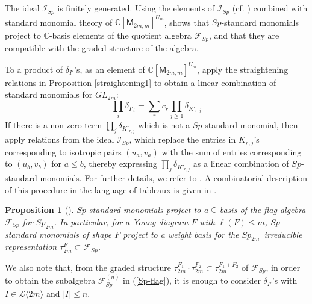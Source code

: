 \documentclass[11pt]{amsart}
\numberwithin{equation}{subsection}
\newtheorem{proposition}[theorem]{Proposition}
\begin{document}
\medskip

\subsection{}\label{straightening2}
The ideal $\mathcal{I}_{{Sp}}$ is finitely generated. 
Using the elements of  $\mathcal{I}_{{Sp}}$ (cf. \cite[\S 17.3]{FH91}) combined 
with standard monomial theory 
of $\mathbb{C}[\mathsf{M}_{2m,m}]^{U_m}$,  \cite{Ki08} shows that 
$Sp$-standard monomials project to $\mathbb{C}$-basis elements of the quotient algebra
$\mathcal{F}_{Sp}$, and that they are compatible with the graded structure of the algebra.

\smallskip

To a product of ${\delta}_{I'}$'s, as an element of $\mathbb{C}[\mathsf{M}_{2m,m}]^{U_m}$, apply 
the straightening relations in Proposition \ref{straightening1} to obtain a linear combination of 
standard monomials for $GL_{2m}$:
$$\prod_i {\delta} _{{I'}_i}=\sum_{r} c_{r} \prod_{j \geq 1} {\delta} _{K'_{r,j}}$$
If there is a non-zero term $\prod_j {\delta} _{K'_{r,j}}$ which is not a $Sp$-standard monomial,
then apply relations from the ideal $\mathcal{I}_{{Sp}}$, which replace the entries in $K_{r,j}$'s
corresponding to isotropic pairs $(u_a, v_{a})$ with the sum of entries corresponding to 
$(u_b, v_{b})$ for $a \leq b$, thereby expressing $\prod_{j} {\delta} _{K'_{r,j}}$ 
as a linear combination of $Sp$-standard monomials. For further details, we refer to \cite{Ki08}.  
A combinatorial description of this procedure in the language of tableaux is given in \cite{Be86}.

\begin{proposition}[{\protect\cite[Theorem 5.20]{Ki08}}]\label{Sp_flagSMT}
${Sp}$-standard monomials project to a $\mathbb{C}$-basis
of the flag algebra $\mathcal{F}_{{Sp}}$ for ${Sp}_{2m}$. In particular, for
a Young diagram $F$ with $\ell (F)\leq m$, ${Sp}$-\textit{standard monomials}
of shape $F$ project to a weight basis for the ${Sp}_{2m}$\ irreducible
representation $\tau _{2m}^{F}\subset \mathcal{F}_{{Sp}}$.
\end{proposition}


We also note that, from the graded structure 
$\tau_{2m}^{F_1} \cdot \tau_{2m}^{F_2} \subset \tau_{2m}^{F_1 + F_2}$ of $\mathcal{F}_{Sp}$, 
in order to obtain the subalgebra $\mathcal{F}^{(n)}_{Sp}$ in (\ref{Sp-flag}), it is enough to 
consider ${\delta}_{I'}$'s with $I\in \mathcal{L}\langle 2m \rangle$ and $|I| \leq n$.
\end{document}
